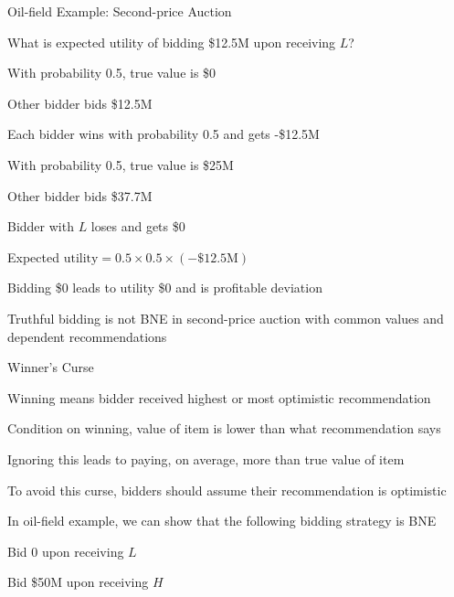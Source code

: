 \documentclass[11pt,aspectratio=169,handout]{beamer}
\begin{document}
  
  \begin{frame}{Oil-field Example: Second-price Auction}
   \begin{itemize}[<+->]
   \setlength{\itemsep}{0.6em}
    \item What is expected utility of bidding \$12.5M upon receiving $L$?
    \begin{itemizes}[0.5em]
     \item With probability 0.5, true value is \$0
     \begin{itemizes}[0.4em]
      \item Other bidder bids \$12.5M
      \item Each bidder wins with probability 0.5 and gets -\$12.5M
     \end{itemizes}
     \item With probability 0.5, true value is \$25M
     \begin{itemizes}[0.4em]
      \item Other bidder bids \$37.7M
      \item Bidder with $L$ loses and gets \$0
     \end{itemizes}
     \item Expected $\text{utility} = 0.5 \times 0.5 \times (-\text{\$12.5M})$
    \end{itemizes}
    \item Bidding \$0 leads to utility \$0 and is \alert{profitable deviation}
    \item \alert{Truthful bidding is not BNE in second-price auction with common values and dependent recommendations}
   \end{itemize}
  \end{frame}
  
  
  \begin{frame}{Winner's Curse}
   \begin{itemizes}
    \item Winning means bidder received highest or \alert{most optimistic} recommendation
    \item Condition on winning, value of item is lower than what recommendation says
    \item Ignoring this leads to paying, on average, \alert{more than} true value of item
    \item To avoid this curse, bidders should assume their recommendation is optimistic
    \item In oil-field example, we can show that the following bidding strategy is BNE
    \begin{itemizes}
     \item Bid 0 upon receiving $L$
     \item Bid \$50M upon receiving $H$  
    \end{itemizes} 
   \end{itemizes}
  \end{frame}
  
\end{document}
